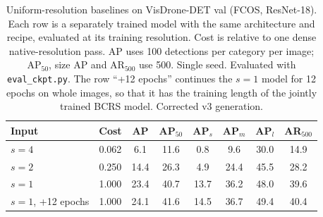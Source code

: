 \begin{table}[t]
\caption{Uniform-resolution baselines on VisDrone-DET val (FCOS, ResNet-18). Each row is a separately trained model with the same architecture and recipe, evaluated at its training resolution. Cost is relative to one dense native-resolution pass. AP uses 100 detections per category per image; AP$_{50}$, size AP and AR$_{500}$ use 500. Single seed. Evaluated with \texttt{eval\_ckpt.py}. The row ``+12 epochs'' continues the $s{=}1$ model for 12 epochs on whole images, so that it has the training length of the jointly trained BCRS model. Corrected v3 generation.}
\label{tab:uniform}
\centering
\begin{tabular}{lccccccc}
\toprule
Input & Cost & AP & AP$_{50}$ & AP$_s$ & AP$_m$ & AP$_l$ & AR$_{500}$ \\
\midrule
$s{=}4$ & 0.062 & 6.1 & 11.6 & 0.8 & 9.6 & 30.0 & 14.9 \\
$s{=}2$ & 0.250 & 14.4 & 26.3 & 4.9 & 24.4 & 45.5 & 28.2 \\
$s{=}1$ & 1.000 & 23.4 & 40.7 & 13.7 & 36.2 & 48.0 & 39.6 \\
$s{=}1$, +12 epochs & 1.000 & 24.1 & 41.6 & 14.5 & 36.7 & 49.4 & 40.4 \\
\bottomrule
\end{tabular}
\end{table}
